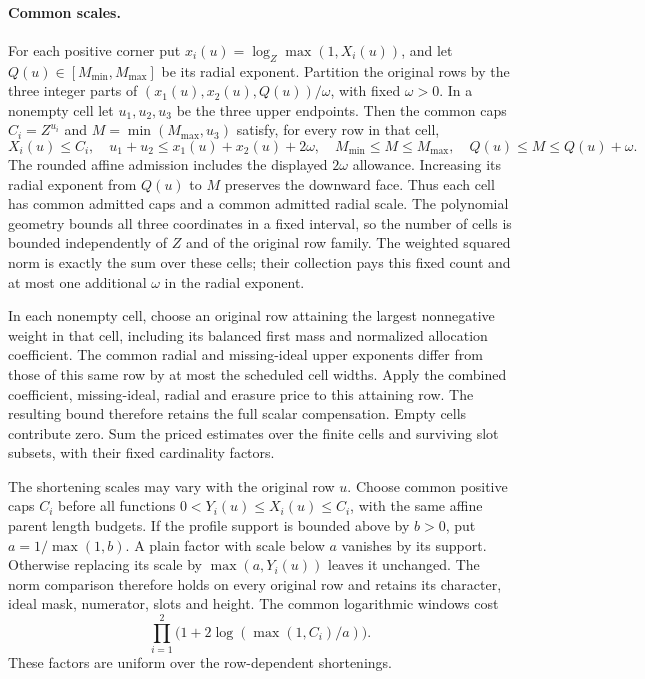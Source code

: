 \paragraph{Common scales.}
For each positive corner put \(x_i(u)=\log_Z\max(1,X_i(u))\),
and let \(Q(u)\in[M_{\min},M_{\max}]\) be its radial exponent.
Partition the original rows by the three integer parts of
\((x_1(u),x_2(u),Q(u))/\omega\), with fixed \(\omega>0\).
In a nonempty cell let \(u_1,u_2,u_3\) be the three upper endpoints.
Then the common caps \(C_i=Z^{u_i}\) and
\(M=\min(M_{\max},u_3)\) satisfy, for every row in that cell,
\[
 X_i(u)\le C_i,\quad
 u_1+u_2\le x_1(u)+x_2(u)+2\omega,\quad
 M_{\min}\le M\le M_{\max},\quad Q(u)\le M\le Q(u)+\omega.
\]
The rounded affine admission includes the displayed \(2\omega\)
allowance. Increasing its radial exponent from \(Q(u)\) to \(M\)
preserves the downward face. Thus each cell has common admitted caps
and a common admitted radial scale. The polynomial geometry bounds
all three coordinates in a fixed interval, so the number of cells
is bounded independently of \(Z\) and of the original row family.
The weighted squared norm is exactly the sum over these cells;
their collection pays this fixed count and at most one additional
\(\omega\) in the radial exponent.

In each nonempty cell, choose an original row attaining the largest
nonnegative weight in that cell, including its balanced first mass and
normalized allocation coefficient. The common radial and missing-ideal
upper exponents differ from those of this same row by at most the
scheduled cell widths. Apply the combined coefficient, missing-ideal,
radial and erasure price to this attaining row. The resulting bound
therefore retains the full scalar compensation. Empty cells contribute
zero. Sum the priced estimates over the finite cells and surviving
slot subsets, with their fixed cardinality factors.

The shortening scales may vary with the original row \(u\).
Choose common positive caps \(C_i\) before all functions
\(0<Y_i(u)\le X_i(u)\le C_i\), with the same affine parent
length budgets. If the profile support is bounded above by \(b>0\),
put \(a=1/\max(1,b)\). A plain factor with scale below \(a\)
vanishes by its support. Otherwise replacing its scale by
\(\max(a,Y_i(u))\) leaves it unchanged. The norm comparison therefore
holds on every original row and retains its character, ideal mask,
numerator, slots and height. The common logarithmic windows cost
\[
 \prod_{i=1}^2\bigl(1+2\log(\max(1,C_i)/a)\bigr).
\]
These factors are uniform over the row-dependent shortenings.

